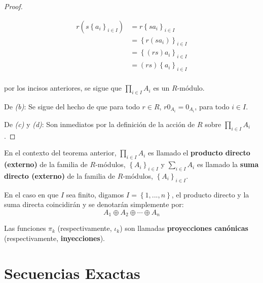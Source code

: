 \documentclass[12pt]{report}
\newcounter{it}
\theoremstyle{largebreak}
\begin{document}
\begin{proof}
\begin{enumerate}[label = \textit{(\arabic*)}]
            \begin{equation*}
                \begin{split}
                    r\left(s\left\{a_i \right\}_{ i\in I} \right)&=r\left\{sa_i \right\}_{ i\in I}\\
                    &=\left\{r(sa_i) \right\}_{ i\in I}\\
                    &=\left\{(rs)a_i \right\}_{ i\in I}\\
                    &=(rs)\left\{a_i \right\}_{ i\in I}\\
                \end{split}
            \end{equation*}
        \end{enumerate}
        por los incisos anteriores, se sigue que $\prod_{ i\in I}A_i$ es un $R$-módulo.

        De \textit{(b)}: Se sigue del hecho de que para todo $r\in R$, $r0_{A_i}=0_{A_i}$, para todo $i\in I$.

        De \textit{(c)} y \textit{(d)}: Son inmediatos por la definición de la acción de $R$ sobre $\prod_{ i\in I}A_i$.
    \end{proof}

    \begin{mydef}
        En el contexto del teorema anterior, $\prod_{ i\in I}A_i$ es llamado el \textbf{producto directo (externo)} de la familia de $R$-módulos, $\left\{A_i \right\}_{ i\in I}$ y $\sum_{ i\in I}A_i$ es llamado la \textbf{suma directo (externo)} de la familia de $R$-módulos, $\left\{A_i \right\}_{ i\in I}$.

        En el caso en que $I$ sea finito, digamos $I=\left\{1,...,n \right\}$, el producto directo y la suma directa coincidirán y se denotarán simplemente por:
        \begin{equation*}
            A_1\oplus A_2\oplus\cdots\oplus A_n
        \end{equation*}

        Las funciones $\pi_k$ (respectivamente, $\iota_k$) son llamadas \textbf{proyecciones canónicas} (respectivamente, \textbf{inyecciones}).
    \end{mydef}


    \section{Secuencias Exactas}
\end{document}
